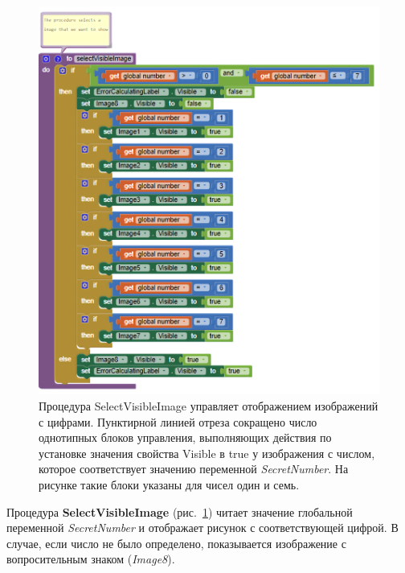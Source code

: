 \begin{figure}
  \includegraphics{./graphics/programs/guess_numbers/procedure_selectVisibleImage_AppInventor_2018.png}
    \caption[Процедура SelectVisibleImage.]{Процедура SelectVisibleImage управляет отображением изображений с цифрами. Пунктирной линией отреза сокращено число однотипных блоков управления, выполняющих действия по установке значения свойства Visible в true у изображения с числом, которое соответствует значению переменной \textit{SecretNumber}. На рисунке такие блоки указаны для чисел один и семь.}
  \label{fig:block:click:select:visible:image}
\end{figure}

Процедура \textbf{SelectVisibleImage} (рис.~\ref{fig:block:click:select:visible:image}) читает значение глобальной переменной \textit{SecretNumber} и отображает рисунок с соответствующей цифрой.
В случае, если число не было определено, показывается изображение с вопросительным знаком (\textit{Image8}).


